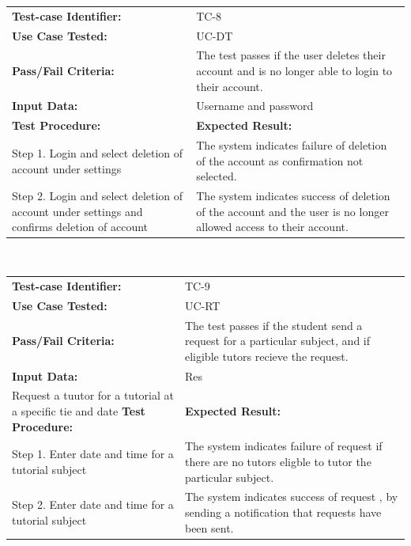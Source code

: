 \documentclass[12pt]{article}
\begin{document}
\begin{tabular}{| p{8cm} | p{8cm} |} \hline
	\textbf{Test-case Identifier:}& TC-8\\
	\textbf{Use Case Tested:}& UC-DT\\
	\textbf{Pass/Fail Criteria:}& The test passes if the user deletes their account and is no longer able to login to their account.\\
	\textbf{Input Data:}& Username and password\\\hline
	\textbf{Test Procedure:}& \textbf{Expected Result:} \\\hline
	Step 1. Login and select deletion of account under settings & The system indicates failure of deletion of the account as confirmation not selected. \\
	Step 2. Login and select deletion of account under settings and confirms deletion of account& The system indicates success of deletion of the account and the user is no longer allowed access to their account.\\
		\hline
\end{tabular}
\\

\begin{tabular}{| p{8cm} | p{8cm} |} \hline
	\textbf{Test-case Identifier:}& TC-9\\
	\textbf{Use Case Tested:}& UC-RT\\
	\textbf{Pass/Fail Criteria:}& The test passes if the student send a request for a particular subject, and if eligible  tutors recieve the request.\\
	\textbf{Input Data:}& Res\\\hline Request a tuutor for a tutorial at a specific tie and date
	\textbf{Test Procedure:}& \textbf{Expected Result:} \\\hline
	Step 1. Enter date and time for a tutorial subject & The system indicates failure of request if there are no tutors eligble to tutor the particular subject. \\
	Step 2. Enter date and time for a tutorial subject & The system indicates success of request , by sending a notification that requests have been sent.\\
		\hline
\end{tabular}
\\
\end{document}
